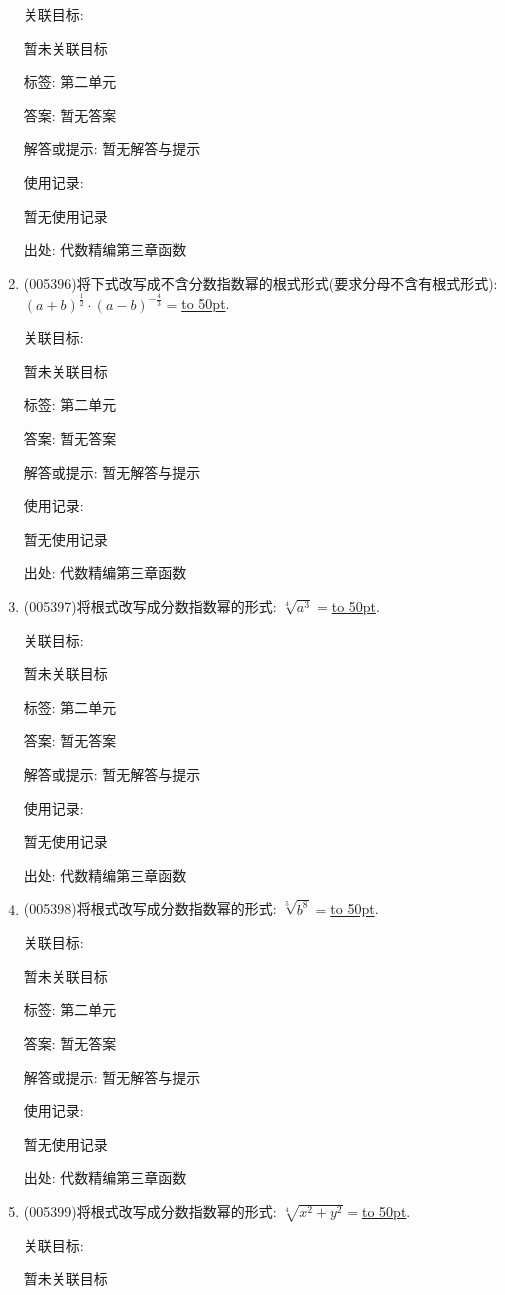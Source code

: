 \documentclass[10pt,a4paper]{article}
\newcommand{\blank}[1]{\underline{\hbox to #1pt{}}}
\begin{document}
\begin{enumerate}[1.]
关联目标:

暂未关联目标



标签: 第二单元

答案: 暂无答案

解答或提示: 暂无解答与提示

使用记录:

暂无使用记录


出处: 代数精编第三章函数
\item { (005396)}将下式改写成不含分数指数幂的根式形式(要求分母不含有根式形式): $(a+b)^{\frac 12}\cdot (a-b)^{-\frac 43}=$\blank{50}.


关联目标:

暂未关联目标



标签: 第二单元

答案: 暂无答案

解答或提示: 暂无解答与提示

使用记录:

暂无使用记录


出处: 代数精编第三章函数
\item { (005397)}将根式改写成分数指数幂的形式: $\sqrt [4]{a^3}=$\blank{50}.


关联目标:

暂未关联目标



标签: 第二单元

答案: 暂无答案

解答或提示: 暂无解答与提示

使用记录:

暂无使用记录


出处: 代数精编第三章函数
\item { (005398)}将根式改写成分数指数幂的形式: $\sqrt [5]{b^8}=$\blank{50}.


关联目标:

暂未关联目标



标签: 第二单元

答案: 暂无答案

解答或提示: 暂无解答与提示

使用记录:

暂无使用记录


出处: 代数精编第三章函数
\item { (005399)}将根式改写成分数指数幂的形式: $\sqrt [4]{x^2+y^2}=$\blank{50}.


关联目标:

暂未关联目标




\end{enumerate}
\end{document}
